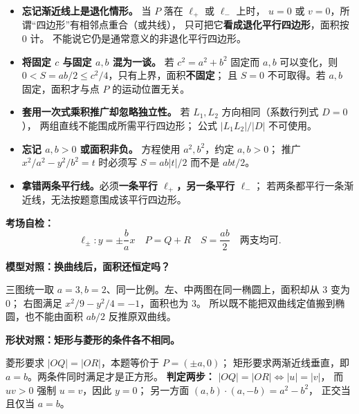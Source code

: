 \begin{trapbox}
\begin{itemize}
\item \textbf{忘记渐近线上是退化情形。}
当 $P$ 落在 $\ell_+$ 或 $\ell_-$ 上时，
$u=0$ 或 $v=0$，所谓“四边形”有相邻点重合（或共线），
只可把它\textbf{看成退化平行四边形}，面积按 $0$ 计。
不能说它仍是通常意义的非退化平行四边形。

\item \textbf{将固定 $c$ 与固定 $a,b$ 混为一谈。}
若 $c^2=a^2+b^2$ 固定而 $a,b$ 可以变化，则
$0<S=ab/2\le c^2/4$，只有上界，面积\textbf{不固定}；
且 $S=0$ 不可取得。若 $a,b$ 固定，面积才与点 $P$ 的运动位置无关。

\item \textbf{套用一次式乘积推广却忽略独立性。}
若 $L_1,L_2$ 方向相同（系数行列式 $D=0$），
两组直线不能围成所需平行四边形；
公式 $|L_1L_2|/|D|$ 不可使用。

\item \textbf{忘记 $a,b>0$ 或面积非负。}
方程使用 $a^2,b^2$，约定 $a,b>0$；
推广 $x^2/a^2-y^2/b^2=t$ 时必须写
$\boxed{S=ab|t|/2}$ 而不是 $abt/2$。

\item \textbf{拿错两条平行线。}必须\textbf{一条平行 $\ell_+$，另一条平行 $\ell_-$}；
若两条都平行一条渐近线，无法按题意围成该平行四边形。
\end{itemize}

\textbf{考场自检：}
\[
\boxed{\ell_\pm:y=\pm\frac ba x}\quad
\boxed{P=Q+R}\quad
\boxed{S=\frac{ab}{2}}\quad
\boxed{\text{两支均可}}.
\]
\end{trapbox}

\clearpage
\begin{trapbox}
\textbf{模型对照：换曲线后，面积还恒定吗？}
\begin{center}

\end{center}
三图统一取 $a=3,b=2$、同一比例。左、中两图在同一椭圆上，面积却从 $3$ 变为 $0$；
右图满足 $x^2/9-y^2/4=-1$，面积也为 $3$。
所以既不能把双曲线定值搬到椭圆，也不能由面积 $ab/2$ 反推原双曲线。

\medskip
\textbf{形状对照：矩形与菱形的条件各不相同。}
\begin{center}

\end{center}
菱形要求 $|OQ|=|OR|$，本题等价于 $P=(\pm a,0)$；
矩形要求两渐近线垂直，即 $a=b$。两条件同时满足才是正方形。
\textbf{判定两步：} $|OQ|=|OR|\Leftrightarrow|u|=|v|$，
而 $uv>0$ 强制 $u=v$，因此 $y=0$；
另一方面 $(a,b)\cdot(a,-b)=a^2-b^2$，
正交当且仅当 $a=b$。
\end{trapbox}
